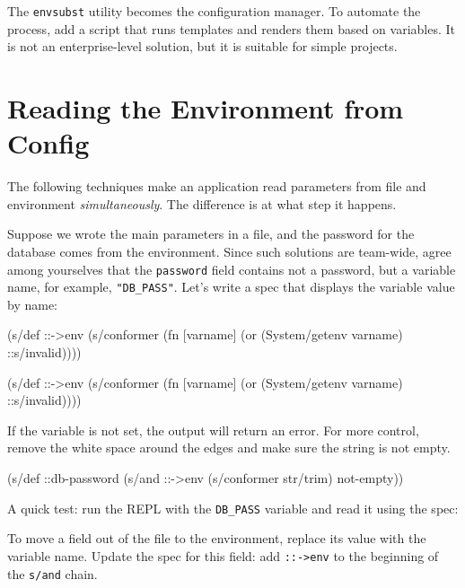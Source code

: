 The \verb|envsubst| utility becomes the configuration manager. To automate the process, add a script that runs templates and renders them based on variables. It is not an enterprise-level solution, but it is suitable for simple projects.

\section{ Reading the Environment from Config}

The following techniques make an application read parameters from file and environment \emph{simultaneously}. The difference is at what step it happens.

Suppose we wrote the main parameters in a file, and the password for the database comes from the environment. Since such solutions are team-wide, agree among yourselves that the \verb|password| field contains not a password, but a variable name, for example, \verb|"DB_PASS"|. Let's write a spec that displays the variable value by name:

\ifnarrow

\begin{clojure}
(s/def ::->env
  (s/conformer
   (fn [varname]
     (or (System/getenv varname)
         ::s/invalid))))
\end{clojure}

\else

\begin{clojure}
(s/def ::->env
  (s/conformer
   (fn [varname]
     (or (System/getenv varname) ::s/invalid))))
\end{clojure}

\fi

If the variable is not set, the output will return an error. For more control, remove the white space around the edges and make sure the string is not empty.

\begin{clojure}
(s/def ::db-password
  (s/and ::->env
         (s/conformer str/trim)
         not-empty))
\end{clojure}

A quick test: run the REPL with the \verb|DB_PASS| variable and read it using the spec:

\begin{bash}
DB_PASS='*(&fd}A53z#$!' lein repl

(s/conform ::db-password "DB_PASS")
"*(&fd}A53z#$!"
\end{bash}

To move a field out of the file to the environment, replace its value with the variable name. Update the spec for this field: add \verb|::->env| to the beginning of the \verb|s/and| chain.

